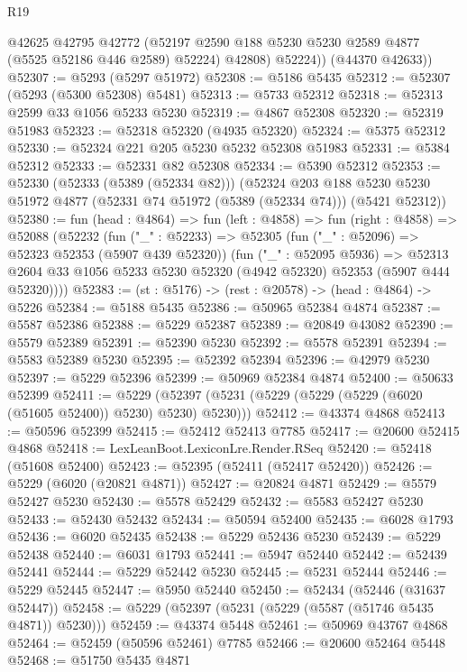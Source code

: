 \begin{lexlean}{R19}
\begin{coremodule}
            @42625
            @42795
            @42772
            (@52197 @2590 @188 @5230 @5230 @2589 @4877 (@5525 @52186 @446 @2589) @52224)
            @42808)
          @52224))
      (@44370 @42633))
@52307 := @5293 (@5297 @51972)
@52308 := @5186 @5435
@52312 := @52307 (@5293 (@5300 @52308) @5481)
@52313 := @5733 @52312
@52318 := @52313 @2599 @33 @1056 @5233 @5230
@52319 := @4867 @52308
@52320 := @52319 @51983
@52323 := @52318 @52320 (@4935 @52320)
@52324 := @5375 @52312
@52330 := @52324 @221 @205 @5230 @5232 @52308 @51983
@52331 := @5384 @52312
@52333 := @52331 @82 @52308
@52334 := @5390 @52312
@52353 := @52330
    (@52333 (@5389 (@52334 @82)))
    (@52324
      @203
      @188
      @5230
      @5230
      @51972
      @4877
      (@52331 @74 @51972 (@5389 (@52334 @74)))
      (@5421 @52312))
@52380 := fun (head : @4864) =>
  fun (left : @4858) =>
  fun (right : @4858) =>
  @52088
    (@52232
      (fun ("_" : @52233) =>
      @52305
        (fun ("_" : @52096) => @52323 @52353 (@5907 @439 @52320))
        (fun ("_" : @52095 @5936) =>
        @52313 @2604 @33 @1056 @5233 @5230 @52320 (@4942 @52320) @52353 (@5907 @444 @52320))))
@52383 := (st : @5176) -> (rest : @20578) -> (head : @4864) -> @5226
@52384 := @5188 @5435
@52386 := @50965 @52384 @4874
@52387 := @5587 @52386
@52388 := @5229 @52387
@52389 := @20849 @43082
@52390 := @5579 @52389
@52391 := @52390 @5230
@52392 := @5578 @52391
@52394 := @5583 @52389 @5230
@52395 := @52392 @52394
@52396 := @42979 @5230
@52397 := @5229 @52396
@52399 := @50969 @52384 @4874
@52400 := @50633 @52399
@52411 := @5229 (@52397 (@5231 (@5229 (@5229 (@5229 (@6020 (@51605 @52400)) @5230) @5230) @5230)))
@52412 := @43374 @4868
@52413 := @50596 @52399
@52415 := @52412 @52413 @7785
@52417 := @20600 @52415 @4868
@52418 := LexLeanBoot.LexiconLre.Render.RSeq
@52420 := @52418 (@51608 @52400)
@52423 := @52395 (@52411 (@52417 @52420))
@52426 := @5229 (@6020 (@20821 @4871))
@52427 := @20824 @4871
@52429 := @5579 @52427 @5230
@52430 := @5578 @52429
@52432 := @5583 @52427 @5230
@52433 := @52430 @52432
@52434 := @50594 @52400
@52435 := @6028 @1793
@52436 := @6020 @52435
@52438 := @5229 @52436 @5230
@52439 := @5229 @52438
@52440 := @6031 @1793
@52441 := @5947 @52440
@52442 := @52439 @52441
@52444 := @5229 @52442 @5230
@52445 := @5231 @52444
@52446 := @5229 @52445
@52447 := @5950 @52440
@52450 := @52434 (@52446 (@31637 @52447))
@52458 := @5229 (@52397 (@5231 (@5229 (@5587 (@51746 @5435 @4871)) @5230)))
@52459 := @43374 @5448
@52461 := @50969 @43767 @4868
@52464 := @52459 (@50596 @52461) @7785
@52466 := @20600 @52464 @5448
@52468 := @51750 @5435 @4871

\end{coremodule}
\end{lexlean}
